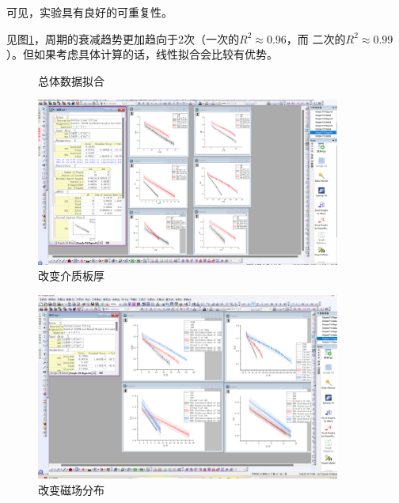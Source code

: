 \documentclass[AutoFakeBold]{LZUThesis}
\begin{document}
可见，实验具有良好的可重复性。

见图\ref{总体数据拟合}，周期的衰减趋势更加趋向于2次（一次的$R^{2} \approx 0.96$，而
二次的$R^{2} \approx 0.99$）。但如果考虑具体计算的话，线性拟合会比较有优势。
\begin{figure}[H]
    \centering
    \caption{总体数据拟合}
    \label{总体数据拟合}
\end{figure}

\begin{figure}[H]
    \centering
    \includegraphics[width=10cm]{figures/板厚.png}
    \caption{改变介质板厚}
    \label{改变介质板厚}
\end{figure}

\begin{figure}[H]
    \centering
    \includegraphics[width=10cm]{figures/磁场分布.png}
    \caption{改变磁场分布}
    \label{改变磁场分布}
\end{figure}
\end{document}
